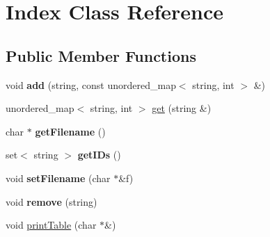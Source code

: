 \hypertarget{class_index}{\section{Index Class Reference}
\label{class_index}
}
\subsection*{Public Member Functions}
\begin{DoxyCompactItemize}
\item 
\hypertarget{class_index_adfd20abe3750afee8f1421fd0e6aad8d}{void {\bfseries add} (string, const unordered\+\_\+map$<$ string, int $>$ \&)}\label{class_index_adfd20abe3750afee8f1421fd0e6aad8d}

\item 
unordered\+\_\+map$<$ string, int $>$ \hyperlink{class_index_a3a544fea79900c4582048c72b224248c}{get} (string \&)
\item 
\hypertarget{class_index_a196291ad34abd7b2be170ad371c3675f}{char $\ast$ {\bfseries get\+Filename} ()}\label{class_index_a196291ad34abd7b2be170ad371c3675f}

\item 
\hypertarget{class_index_a55764860da11db7a79ec336ab357ab83}{set$<$ string $>$ {\bfseries get\+I\+Ds} ()}\label{class_index_a55764860da11db7a79ec336ab357ab83}

\item 
\hypertarget{class_index_a61a26a5b5e3f51742e63e6866643780a}{void {\bfseries set\+Filename} (char $\ast$\&f)}\label{class_index_a61a26a5b5e3f51742e63e6866643780a}

\item 
\hypertarget{class_index_a822ca8f4e89b7fc4d1edb4afe5f40b3d}{void {\bfseries remove} (string)}\label{class_index_a822ca8f4e89b7fc4d1edb4afe5f40b3d}

\item 
void \hyperlink{class_index_ac4be91ccc196ec6b7b5f0752b02838b0}{print\+Table} (char $\ast$\&)
\end{DoxyCompactItemize}


